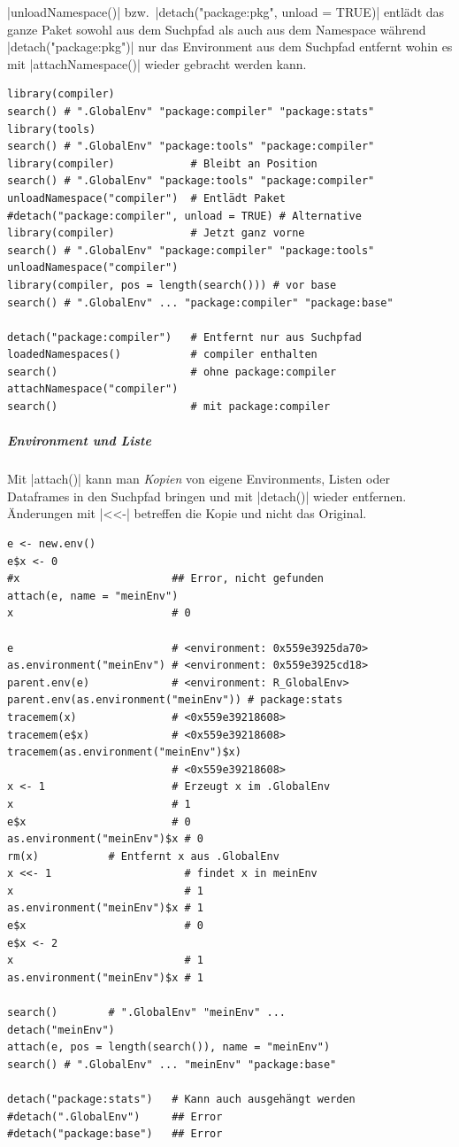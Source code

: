 \documentclass[10pt,twocolumn]{scrartcl}
\renewcommand{\lstinline}{\mycoloredinline}
\begin{document}
\lstinline|unloadNamespace()| bzw.\ \lstinline|detach("package:pkg", unload = TRUE)| entlädt das ganze Paket sowohl aus dem Suchpfad als auch aus dem Namespace während \lstinline|detach("package:pkg")| nur das Environment aus dem Suchpfad entfernt wohin es mit \lstinline|attachNamespace()| wieder gebracht werden kann.

\begin{lstlisting}
library(compiler)
search() # ".GlobalEnv" "package:compiler" "package:stats"
library(tools)
search() # ".GlobalEnv" "package:tools" "package:compiler"
library(compiler)            # Bleibt an Position
search() # ".GlobalEnv" "package:tools" "package:compiler"
unloadNamespace("compiler")  # Entlädt Paket
#detach("package:compiler", unload = TRUE) # Alternative
library(compiler)            # Jetzt ganz vorne
search() # ".GlobalEnv" "package:compiler" "package:tools"
unloadNamespace("compiler")
library(compiler, pos = length(search())) # vor base
search() # ".GlobalEnv" ... "package:compiler" "package:base"

detach("package:compiler")   # Entfernt nur aus Suchpfad
loadedNamespaces()           # compiler enthalten
search()                     # ohne package:compiler
attachNamespace("compiler")
search()                     # mit package:compiler
\end{lstlisting}


\subparagraph{Environment und Liste}

Mit \lstinline|attach()| kann man \emph{Kopien} von eigene Environments, Listen oder Dataframes in den Suchpfad bringen und mit \lstinline|detach()| wieder entfernen. Änderungen mit \lstinline|<<-| betreffen die Kopie und nicht das Original.

\begin{lstlisting}
e <- new.env()
e$x <- 0
#x                        ## Error, nicht gefunden
attach(e, name = "meinEnv")
x                         # 0

e                         # <environment: 0x559e3925da70>
as.environment("meinEnv") # <environment: 0x559e3925cd18>
parent.env(e)             # <environment: R_GlobalEnv>
parent.env(as.environment("meinEnv")) # package:stats
tracemem(x)               # <0x559e39218608>
tracemem(e$x)             # <0x559e39218608>
tracemem(as.environment("meinEnv")$x)
                          # <0x559e39218608>
x <- 1                    # Erzeugt x im .GlobalEnv
x                         # 1
e$x                       # 0
as.environment("meinEnv")$x # 0
rm(x)           # Entfernt x aus .GlobalEnv
x <<- 1                     # findet x in meinEnv
x                           # 1
as.environment("meinEnv")$x # 1
e$x                         # 0
e$x <- 2
x                           # 1
as.environment("meinEnv")$x # 1

search()        # ".GlobalEnv" "meinEnv" ...
detach("meinEnv")
attach(e, pos = length(search()), name = "meinEnv")
search() # ".GlobalEnv" ... "meinEnv" "package:base"

detach("package:stats")   # Kann auch ausgehängt werden
#detach(".GlobalEnv")     ## Error
#detach("package:base")   ## Error
\end{lstlisting}
\end{document}
